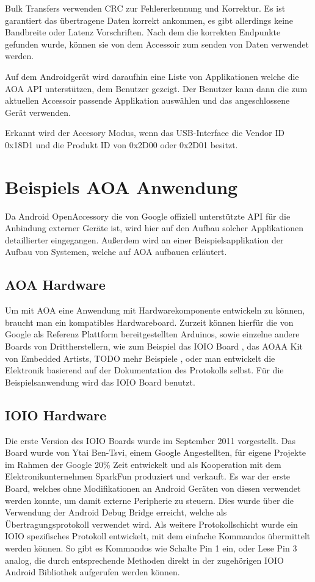 \documentclass[12pt,journal,compsoc]{IEEEtran}
\begin{document}
Bulk Transfers verwenden CRC zur Fehlererkennung und Korrektur. Es ist garantiert das übertragene Daten korrekt ankommen, es gibt allerdings keine Bandbreite oder Latenz Vorschriften.
\cite{usbbulk}
Nach dem die korrekten Endpunkte gefunden wurde, können sie von dem Accessoir zum senden von Daten verwendet werden.

Auf dem Androidgerät wird daraufhin eine Liste von Applikationen welche die AOA API unterstützen, dem Benutzer gezeigt. Der Benutzer kann dann die zum aktuellen Accessoir passende Applikation auswählen und das angeschlossene Gerät verwenden.
\begin{figure}[h]
\centering
\def\svgwidth{\columnwidth}

\end{figure}

Erkannt wird der Accesory Modus, wenn das USB-Interface die Vendor ID 0x18D1 und die Produkt ID von 0x2D00 oder 0x2D01 besitzt. 

\section{Beispiels AOA Anwendung}
Da Android OpenAccessory die von Google offiziell unterstützte API für die Anbindung externer Geräte ist, wird hier auf den Aufbau solcher Applikationen detaillierter eingegangen. Außerdem wird an einer Beispielsapplikation der Aufbau von Systemen, welche auf AOA aufbauen erläutert.
\subsection{AOA Hardware}
Um mit AOA eine Anwendung mit Hardwarekomponente entwickeln zu können, braucht man ein kompatibles Hardwareboard.
Zurzeit können hierfür die von Google als Referenz Plattform bereitgestellten Arduinos, sowie einzelne andere Boards von Drittherstellern, wie zum Beispiel das IOIO Board \cite{ioio}, das AOAA Kit von Embedded Artists\cite{aoaa},  TODO mehr Beispiele , oder man entwickelt die Elektronik basierend auf der Dokumentation des Protokolls selbst\cite{aoaprotocol2}.
Für die Beispielsanwendung wird das IOIO Board benutzt.

\subsection{IOIO Hardware}
Die erste Version des IOIO Boards wurde im September 2011 vorgestellt. Das Board wurde von Ytai Ben-Tsvi, einem Google Angestellten, für eigene Projekte im Rahmen der Google 20\% Zeit entwickelt und als Kooperation mit dem Elektronikunternehmen SparkFun produziert und verkauft.
Es war der erste Board, welches ohne Modifikationen an Android Geräten von diesen verwendet werden konnte, um damit externe Peripherie zu steuern.
Dies wurde über die Verwendung der Android Debug Bridge erreicht, welche als Übertragungsprotokoll verwendet wird.
Als weitere Protokollschicht wurde ein IOIO spezifisches Protokoll entwickelt, mit dem einfache Kommandos übermittelt werden können.
So gibt es Kommandos wie \glqq Schalte Pin 1 ein\grqq, oder \glqq Lese Pin 3 analog\grqq, die durch entsprechende Methoden direkt in der zugehörigen IOIO Android Bibliothek aufgerufen werden können.
\end{document}
